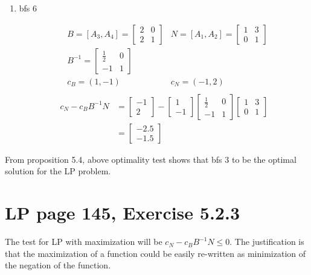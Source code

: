 \documentclass[11pt]{article}
\begin{document}
\begin{enumerate}
    \item bfs 6\par
    \begin{align*}
        & B = [A_3, A_4]=\begin{bmatrix} 2 & 0 \\ 2 & 1\end{bmatrix}& N = [A_1, A_2]=\begin{bmatrix} 1 & 3 \\ 0 & 1\end{bmatrix} \\
        & B^{-1} = \begin{bmatrix} \frac{1}{2} & 0 \\ -1 & 1 \end{bmatrix} & \\
        & c_B = (1, -1) & c_N =(-1,2)\\
    \end{align*}
    \begin{align*}
         c_N - c_B B^{-1}N &=  \begin{bmatrix} -1 \\ 2 \end{bmatrix}  - \begin{bmatrix} 1 \\ -1 \end{bmatrix} \begin{bmatrix} \frac{1}{2} & 0 \\ -1 & 1 \end{bmatrix} \begin{bmatrix} 1 & 3 \\ 0 & 1\end{bmatrix}\\
        &= \begin{bmatrix} -2.5 \\ -1.5\end{bmatrix}
    \end{align*}
\end{enumerate}

From proposition 5.4, above optimality test shows that bfs 3 to be the optimal solution for the LP problem.

\section{LP page 145, Exercise 5.2.3}

The test for LP with maximization will be $c_N - c_B B^{-1}N \leq 0$. The justification is that the maximization of a function could be easily re-written as minimization of the negation of the function. 
\end{document}
